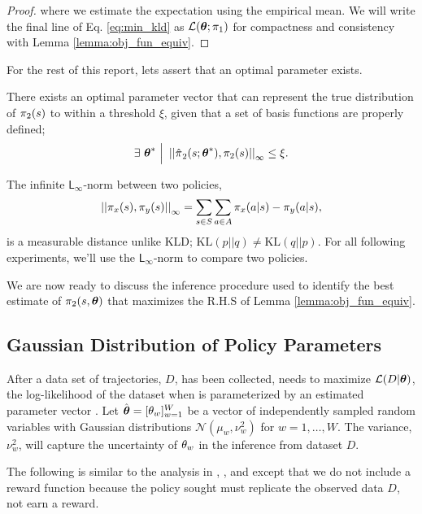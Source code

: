 \begin{proof}
        \noindent
        where we estimate the expectation using the empirical mean. We will write the final line of Eq.
        \ref{eq:min_kld} as $\mathcal{L}(\boldsymbol{\mathbb{\theta}}; \pi_{1})$ for compactness and consistency with Lemma
        \ref{lemma:obj_fun_equiv}.

    \end{proof}

    For the rest of this report, lets assert that an optimal parameter exists.
    \begin{assumption}\label{assump:opt_policy_err}
        There exists an optimal parameter vector that can represent the true distribution of $\pi_{2}(s)$ to within a
        threshold $\xi$, given that a set of basis functions are properly defined;
        \[
            \exists\ \optimal{\paramVec}\ \Big|\  \InfNorm{\estimate{\policy{}}_2(s;\optimal{\paramVec}),\policy{2}(s)}
                \leq \xi.
        \]
    \end{assumption}

    \noindent
    The infinite $\mathsf{L_{\infty}}$-norm between two policies,
    \[
        \left|\left|\pi_{x}(s),\pi_{y}(s)\right|\right|_{\infty} = \sum_{s \in S}\sum_{a \in A}\pi_{x}(a|s)-\pi_{y}(a|s),
    \]
    is a measurable distance unlike \ac{KLD}; $\text{KL}(p||q) \neq \text{KL}(q||p)$. For all following experiments,
    we'll use the $\mathsf{L_{\infty}}$-norm to compare two policies.

    We are now ready to discuss the inference procedure used to identify the best estimate of $\pi_{2}(s, \boldsymbol{\mathbb{\theta}})$
    that maximizes the R.H.S of Lemma \ref{lemma:obj_fun_equiv}.


\subsection{Gaussian Distribution of Policy Parameters}\label{sec:gauss_policy}

    After a data set of trajectories, $D$, has been collected,  needs to maximize $\mathcal{L}(D|\boldsymbol{\mathbb{\theta}})$, the
    log-likelihood of the dataset when  is parameterized by an estimated parameter vector
    \estimate{\paramVec}. Let $\hat{\boldsymbol{\mathbb{\theta}}} = [ \theta_{w}]_{w=1}^W$ be a vector of independently sampled random
    variables with Gaussian distributions $\mathcal{N}(\mu_w, \nu_w^2)$ for $w=1,\ldots,W$. The variance, $\nu_w^2$,
    will capture the uncertainty of $\theta_{w}$ in the inference from dataset $D$.

    The following is similar to the analysis in \cite{tangkaratt2014model}, \cite{herman2016inverse}, and
    \cite{sehnke2010parameter} except that we do not include a reward function because the policy sought must replicate
    the observed data $D$, not earn a reward.

